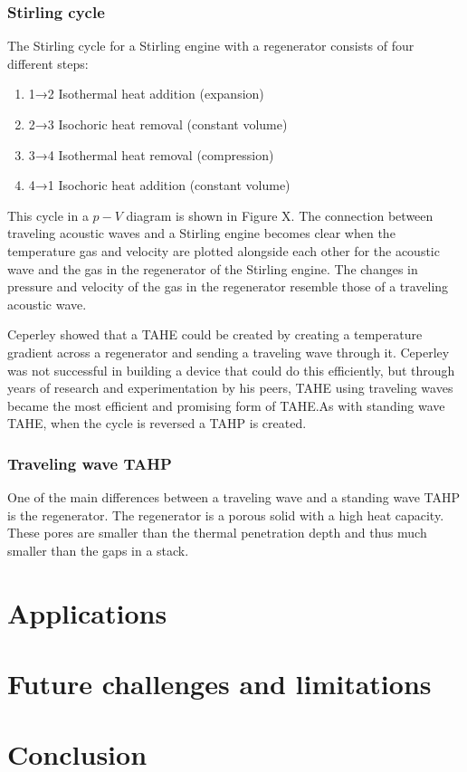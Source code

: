 \documentclass{article}
\begin{document}
\subsubsection{Stirling cycle}
The Stirling cycle for a Stirling engine with a regenerator consists of four different steps:
\begin{enumerate}[i]
  \item 1→2 Isothermal heat addition (expansion)
  \item 2→3 Isochoric heat removal (constant volume)
  \item 3→4 Isothermal heat removal (compression)
  \item 4→1 Isochoric heat addition (constant volume)
\end{enumerate}
This cycle in a \(p-V\) diagram is shown in Figure X. The connection between traveling acoustic waves and a Stirling engine becomes clear when the temperature gas and velocity are plotted alongside each other for the acoustic wave and the gas in the regenerator of the Stirling engine. The changes in pressure and velocity of the gas in the regenerator resemble those of a traveling acoustic wave.

Ceperley\cite{ceperleyStirling} showed that a TAHE could be created by creating a temperature gradient across a regenerator and sending a traveling wave through it. Ceperley was not successful in building a device that could do this efficiently, but through years of research and experimentation by his peers, TAHE using traveling waves became the most efficient and promising form of TAHE.\@ As with standing wave TAHE, when the cycle is reversed a TAHP is created.

\subsubsection{Traveling wave TAHP}
One of the main differences between a traveling wave and a standing wave TAHP is the regenerator. The regenerator is a porous solid with a high heat capacity. These pores are smaller than the thermal penetration depth and thus much smaller than the gaps in a stack.
\section{Applications}

\section{Future challenges and limitations}

\section{Conclusion}


\end{document}
